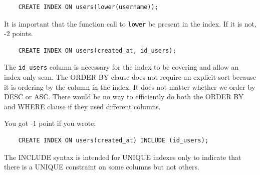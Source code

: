 \documentclass[12pt]{exam}
\theoremstyle{definition}
\begin{document}
\begin{questions}

\begin{solution}
    \begin{lstlisting}
    CREATE INDEX ON users(lower(username));
    \end{lstlisting}
    It is important that the function call to \lstinline{lower} be present in the index.
    If it is not, -2 points.
\end{solution}

\newpage
{}
\begin{solution}
    \begin{lstlisting}
    CREATE INDEX ON users(created_at, id_users);
    \end{lstlisting}
    The \lstinline{id_users} column is necessary for the index to be covering and allow an index only scan.
    The ORDER BY clause does not require an explicit sort because it is ordering by the column in the index.
    It does not matter whether we order by DESC or ASC.
    There would be no way to efficiently do both the ORDER BY and WHERE clause if they used different columns.

    You got -1 point if you wrote:
    \begin{lstlisting}
    CREATE INDEX ON users(created_at) INCLUDE (id_users);
    \end{lstlisting}
    The INCLUDE syntax is intended for UNIQUE indexes only to indicate that there is a UNIQUE constraint on some columns but not others.
\end{solution}
\vspace{2in}


\end{questions}
\end{document}
